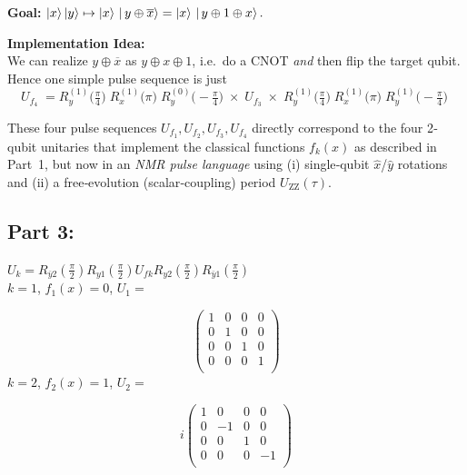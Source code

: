 \documentclass[11pt]{article}
\begin{document}
\subsubsection*{}

\textbf{Goal:} 
$\ket{x}\ket{y} \mapsto \ket{x}\,\ket{\,y\oplus \overline{x}} 
= \ket{x}\,\ket{\,y \oplus 1 \oplus x}.$

\textbf{Implementation Idea:}\\
We can realize $y\oplus \overline{x}$ as $y\oplus x \oplus 1$, 
i.e.\ do a \textsc{CNOT} \emph{and} then flip the target qubit. 
Hence one simple pulse sequence is just 
\[
  U_{f_4} \;=R_{y}^{(1)}\!\bigl(\tfrac{\pi}{4}\bigr)\; R_{x}^{(1)}\!\bigl(\pi \bigr)\; R_{y}^{(0)}\!\bigl(-\tfrac{\pi}{4}\bigr)\; \times \; U_{f_3}\;\times \; R_{y}^{(1)}\!\bigl(\tfrac{\pi}{4}\bigr)\; R_{x}^{(1)}\!\bigl(\pi \bigr)\; R_{y}^{(1)}\!\bigl(-\tfrac{\pi}{4}\bigr)\;
\]

\bigskip

\noindent
These four pulse sequences $U_{f_1}, U_{f_2}, U_{f_3}, U_{f_4}$ 
directly correspond to the four 2‐qubit unitaries that implement the classical functions $f_k(x)$ 
as described in Part~1, but now in an \emph{NMR pulse language} using 
(i) single‐qubit $\hat{x}$/$\hat{y}$ rotations and 
(ii) a free‐evolution (scalar‐coupling) period $U_{\text{ZZ}}(\tau)$.

\subsection*{Part 3: }
\noindent
$U_k = R_{\bar{y}2}(\frac{\pi}{2}) R_{y1}(\frac{\pi}{2}) U_{fk} R_{y2}(\frac{\pi}{2}) R_{\bar{y}1}(\frac{\pi}{2})$\\
\noindent
$k=1$, \(f_1(x) = 0\), $U_1 = $

\[
\begin{pmatrix}
1 & 0 & 0 & 0 \\
0 & 1 & 0 & 0 \\
0 & 0 & 1 & 0 \\
0 & 0 & 0 & 1 \\
\end{pmatrix}
\]
\noindent
$k=2$, \(f_2(x) = 1\), $U_2 = $

\[
i
\begin{pmatrix}
1 & 0 & 0 & 0 \\
0 & -1 & 0 & 0 \\
0 & 0 & 1 & 0 \\
0 & 0 & 0 & -1 \\
\end{pmatrix}
\]
\end{document}
